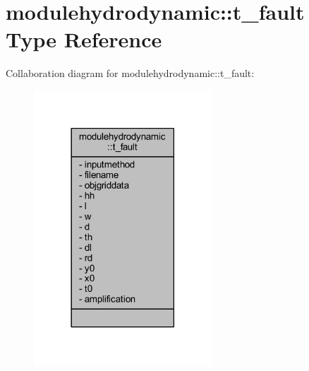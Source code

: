 \hypertarget{structmodulehydrodynamic_1_1t__fault}{}\section{modulehydrodynamic\+:\+:t\+\_\+fault Type Reference}
\label{structmodulehydrodynamic_1_1t__fault}


Collaboration diagram for modulehydrodynamic\+:\+:t\+\_\+fault\+:\nopagebreak
\begin{figure}[H]
\begin{center}
\leavevmode
\includegraphics[width=189pt]{structmodulehydrodynamic_1_1t__fault__coll__graph}
\end{center}
\end{figure}

